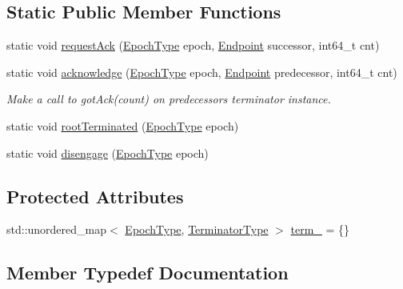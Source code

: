 \subsection*{Static Public Member Functions}
\begin{DoxyCompactItemize}
\item 
static void \hyperlink{structvt_1_1term_1_1ds_1_1_state_d_s_acdf0151492a1e35c6565c65b138e8ac9}{request\+Ack} (\hyperlink{namespacevt_a985a5adf291c34a3ca263b3378388236}{Epoch\+Type} epoch, \hyperlink{structvt_1_1term_1_1ds_1_1_state_d_s_aba302de614dd639f5d93f4f5b6dd6108}{Endpoint} successor, int64\+\_\+t cnt)
\item 
static void \hyperlink{structvt_1_1term_1_1ds_1_1_state_d_s_a60aafca7a5eef1368e55c02508a0f3bf}{acknowledge} (\hyperlink{namespacevt_a985a5adf291c34a3ca263b3378388236}{Epoch\+Type} epoch, \hyperlink{structvt_1_1term_1_1ds_1_1_state_d_s_aba302de614dd639f5d93f4f5b6dd6108}{Endpoint} predecessor, int64\+\_\+t cnt)
\begin{DoxyCompactList}\small\item\em Make a call to got\+Ack(count) on predecessor\textquotesingle{}s terminator instance. \end{DoxyCompactList}\item 
static void \hyperlink{structvt_1_1term_1_1ds_1_1_state_d_s_a26ae9b485dbb46e46b48e73a321cfd8b}{root\+Terminated} (\hyperlink{namespacevt_a985a5adf291c34a3ca263b3378388236}{Epoch\+Type} epoch)
\item 
static void \hyperlink{structvt_1_1term_1_1ds_1_1_state_d_s_a55a5290621f7de06a421793daba374e8}{disengage} (\hyperlink{namespacevt_a985a5adf291c34a3ca263b3378388236}{Epoch\+Type} epoch)
\end{DoxyCompactItemize}
\subsection*{Protected Attributes}
\begin{DoxyCompactItemize}
\item 
std\+::unordered\+\_\+map$<$ \hyperlink{namespacevt_a985a5adf291c34a3ca263b3378388236}{Epoch\+Type}, \hyperlink{structvt_1_1term_1_1ds_1_1_state_d_s_af98cfe31c25f710273ee103026d538e4}{Terminator\+Type} $>$ \hyperlink{structvt_1_1term_1_1ds_1_1_state_d_s_a97a12b9645ebe99171d7680baab34b5d}{term\+\_\+} = \{\}
\end{DoxyCompactItemize}


\subsection{Member Typedef Documentation}
\mbox{\label{structvt_1_1term_1_1ds_1_1_state_d_s_aba302de614dd639f5d93f4f5b6dd6108}} 
